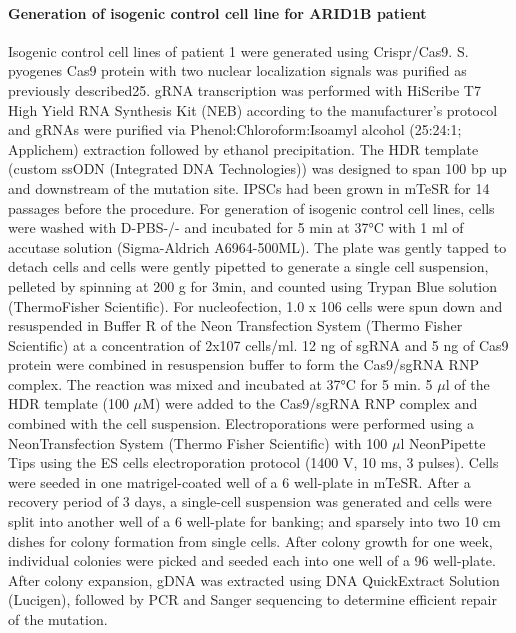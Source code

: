 \paragraph{Generation of isogenic control cell line for ARID1B patient}
Isogenic control cell lines of patient 1 were generated using Crispr/Cas9. S. pyogenes Cas9 protein with two nuclear localization signals was purified as previously described25. gRNA transcription was performed with HiScribe T7 High Yield RNA Synthesis Kit (NEB) according to the manufacturer's protocol and gRNAs were purified via Phenol:Chloroform:Isoamyl alcohol (25:24:1; Applichem) extraction followed by ethanol precipitation. The HDR template (custom ssODN (Integrated DNA Technologies)) was designed to span 100 bp up and downstream of the mutation site. IPSCs had been grown in mTeSR for 14 passages before the procedure. For generation of isogenic control cell lines, cells were washed with D-PBS-/- and incubated for 5 min at 37°C with 1 ml of accutase solution (Sigma-Aldrich A6964-500ML). The plate was gently tapped to detach cells and cells were gently pipetted to generate a single cell suspension, pelleted by spinning at 200 g for 3min, and counted using Trypan Blue solution (ThermoFisher Scientific). For nucleofection, 1.0 x 106 cells were spun down and resuspended in Buffer R of the Neon Transfection System (Thermo Fisher Scientific) at a concentration of 2x107 cells/ml. 12 ng of sgRNA and 5 ng of Cas9 protein were combined in resuspension buffer to form the Cas9/sgRNA RNP complex. The reaction was mixed and incubated at 37°C for 5 min. 5 $\mu$l of the HDR template (100 $\mu$M) were added to the Cas9/sgRNA RNP complex and combined with the cell suspension. Electroporations were performed using a Neon\textregistered Transfection System (Thermo Fisher Scientific) with 100 $\mu$l Neon\textregistered Pipette Tips using the ES cells electroporation protocol (1400 V, 10 ms, 3 pulses). Cells were seeded in one matrigel-coated well of a 6 well-plate in mTeSR. After a recovery period of 3 days, a single-cell suspension was generated and cells were split into another well of a 6 well-plate for banking; and sparsely into two 10 cm dishes for colony formation from single cells. After colony growth for one week, individual colonies were picked and seeded each into one well of a 96 well-plate. After colony expansion, gDNA was extracted using DNA QuickExtract Solution (Lucigen), followed by PCR and Sanger sequencing to determine efficient repair of the mutation. 



